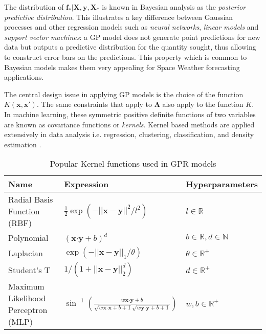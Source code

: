 The distribution of $\mathbf{f_*}| \mathbf{X},\mathbf{y},\mathbf{X_*}$ is known in Bayesian 
analysis as the \emph{posterior predictive distribution}. This illustrates a key difference between 
Gaussian processes and other regression models such as \emph{neural networks}, 
\emph{linear models} and \emph{support vector machines}: a GP model does not 
generate point predictions for new data but outputs a predictive distribution for the quantity 
sought, thus allowing to construct error bars on the predictions. This property which is common to 
Bayesian models makes them very appealing for Space Weather forecasting applications. 

The central design issue in applying GP models is the choice of the function 
$K(\mathbf{x}, \mathbf{x}')$. The same constraints that apply to $\mathbf{\Lambda}$ also apply to 
the function $K$. In machine learning, these symmetric positive definite functions of two variables 
are known as covariance functions or \emph{kernels}. Kernel based methods are applied extensively 
in data analysis \citep{Scholkopf:2001:LKS:559923,hofmann2008} i.e. regression, clustering, 
classification, and density estimation \citep{Girolami:2002:OSD:638929.638938}.

\begin{table}[ht]
    \caption{Popular Kernel functions used in GPR models}
    \centering
    \begin{tabular}{l l l}
    \hline
     \textbf{Name}  & \textbf{Expression} & \textbf{Hyperparameters}  \\
    \hline
      {\small Radial Basis Function (RBF)}  & ${\scriptstyle \frac{1}{2} \exp(-||\mathbf{x} - \mathbf{y}||^2/l^2)}$  & ${\scriptstyle l \in \mathbb{R}}$   \\
      
      {\small Polynomial}  & ${\scriptstyle (\mathbf{x}\boldsymbol{\cdot} \mathbf{y} + b)^d}$ & ${\scriptstyle b \in \mathbb{R}, d \in \mathbb{N}}$   \\
      
      {\small Laplacian}  & ${\scriptstyle \exp(-||\mathbf{x} - \mathbf{y}||_{1}/\theta)}$  & ${\scriptstyle \theta \in \mathbb{R}^+}$  \\
      
      {\small Student's T}  & ${\scriptstyle 1/(1 + ||\mathbf{x} - \mathbf{y}||_{2}^d)}$ & ${\scriptstyle d \in \mathbb{R}^{+}}$\\
      
      {\small Maximum Likelihood Perceptron (MLP)}  & ${\scriptstyle \sin^{-1}\left(\frac{w\mathbf{x}\boldsymbol{\cdot} \mathbf{y} + b}{\sqrt{w\mathbf{x}\boldsymbol{\cdot} \mathbf{x} + b + 1} \sqrt{w\mathbf{y}\boldsymbol{\cdot} \mathbf{y} + b + 1}}\right)}$ & ${\scriptstyle w, b \in \mathbb{R}^{+}}$\\
    \hline
    \end{tabular}
    \label{table:kernel}
\end{table}
    
